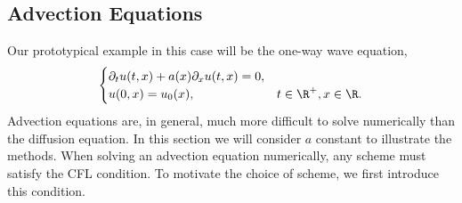 \subsection{Advection Equations}
Our prototypical example in this case will be the one-way wave equation,
\begin{equation}\label{eq:wave}\begin{cases}
\partial_t u(t,x) + a(x)\partial_x u(t,x)=0,\\
u(0,x) = u_0(x),  &t\in\R^+, x\in\R.
\end{cases}\end{equation}
Advection equations are, in general, much more difficult to solve numerically than the diffusion equation. In this section we will consider $a$ constant to illustrate the methods. When solving an advection equation numerically, any scheme must satisfy the CFL condition. To motivate the choice of scheme, we first introduce this condition.

